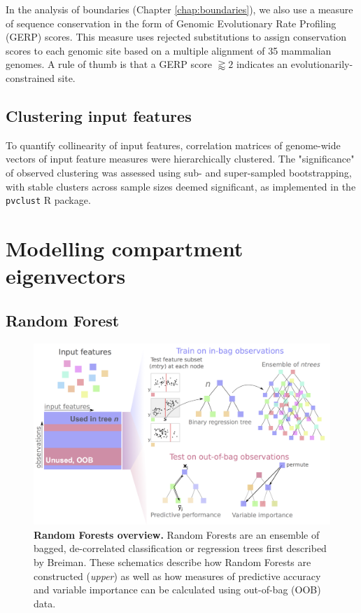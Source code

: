 \documentclass[a4paper,11pt,oneside]{book}
\begin{document}
In the analysis of boundaries (Chapter \ref{chap:boundaries}), we also use a measure of sequence conservation in the form of Genomic Evolutionary Rate Profiling (GERP) scores. This measure uses rejected substitutions to assign conservation scores to each genomic site based on a multiple alignment of 35 mammalian genomes.\cite{Cooper2005, Davydov2010a} A rule of thumb is that a GERP score $\gtrapprox 2$ indicates an evolutionarily-constrained site.\cite{Goode2010}

\subsection{Clustering input features}\label{meth:clustersig}

To quantify collinearity of input features, correlation matrices of genome-wide vectors of input feature measures were hierarchically clustered. The "significance" of observed clustering was assessed using sub- and super-sampled bootstrapping, with stable clusters across sample sizes deemed significant, as implemented in the \texttt{pvclust} R package.\cite{Suzuki2006a}

\section{Modelling compartment eigenvectors}\label{modelling}

\subsection{Random Forest}\label{sec:rf}

\begin{figure}
\begin{center}
\includegraphics[width=4.5in]{randforests.png}
\captionsetup{width=\textwidth}
\caption[Random Forests overview.]{ {\bf Random Forests overview. } 
 Random Forests are an ensemble of bagged, de-correlated classification or regression trees first described by Breiman.\cite{Breiman2001a} These schematics describe how Random Forests are constructed (\emph{upper}) as well as how measures of predictive accuracy and variable importance can be calculated using out-of-bag (OOB) data.
}\label{fig:randforests}
\end{center}
\end{figure} 
\end{document}
